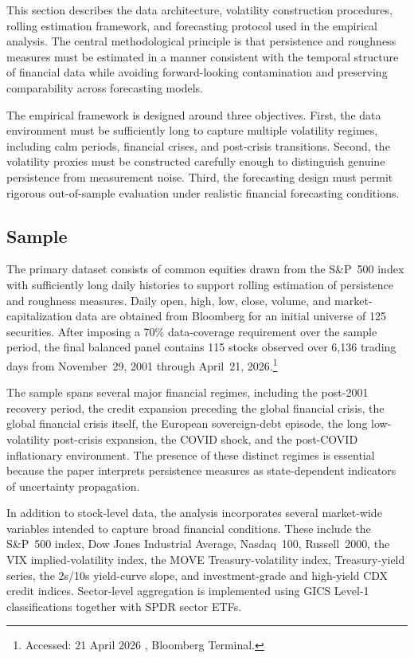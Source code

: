 \documentclass[unnumsec,webpdf,contemporary,large]{oup-authoring-template}%
\theoremstyle{thmstyleone}%
\theoremstyle{thmstyletwo}%
\theoremstyle{thmstylethree}%
\begin{document}
This section describes the data architecture, volatility construction
procedures, rolling estimation framework, and forecasting protocol used in
the empirical analysis. The central methodological principle is that
persistence and roughness measures must be estimated in a manner consistent
with the temporal structure of financial data while avoiding forward-looking
contamination and preserving comparability across forecasting models.

The empirical framework is designed around three objectives. First, the
data environment must be sufficiently long to capture multiple volatility
regimes, including calm periods, financial crises, and post-crisis
transitions. Second, the volatility proxies must be constructed carefully
enough to distinguish genuine persistence from measurement noise. Third,
the forecasting design must permit rigorous out-of-sample evaluation under
realistic financial forecasting conditions.

\subsection{Sample}

The primary dataset consists of common equities drawn from the S\&P~500
index with sufficiently long daily histories to support rolling estimation
of persistence and roughness measures. Daily open, high, low, close,
volume, and market-capitalization data are obtained from Bloomberg for an
initial universe of 125 securities. After imposing a 70\% data-coverage
requirement over the sample period, the final balanced panel contains
115 stocks observed over 6,136 trading days from November~29, 2001 through
April~21, 2026.\footnote{Accessed: 21 April 2026 , Bloomberg Terminal.}

The sample spans several major financial regimes, including the post-2001
recovery period, the credit expansion preceding the global financial
crisis, the global financial crisis itself, the European sovereign-debt
episode, the long low-volatility post-crisis expansion, the COVID shock,
and the post-COVID inflationary environment. The presence of these distinct
regimes is essential because the paper interprets persistence measures as
state-dependent indicators of uncertainty propagation.

In addition to stock-level data, the analysis incorporates several
market-wide variables intended to capture broad financial conditions. These
include the S\&P~500 index, Dow Jones Industrial Average, Nasdaq~100,
Russell~2000, the VIX implied-volatility index, the MOVE Treasury-volatility
index, Treasury-yield series, the 2s/10s yield-curve slope, and
investment-grade and high-yield CDX credit indices. Sector-level
aggregation is implemented using GICS Level-1 classifications together
with SPDR sector ETFs.
\end{document}
